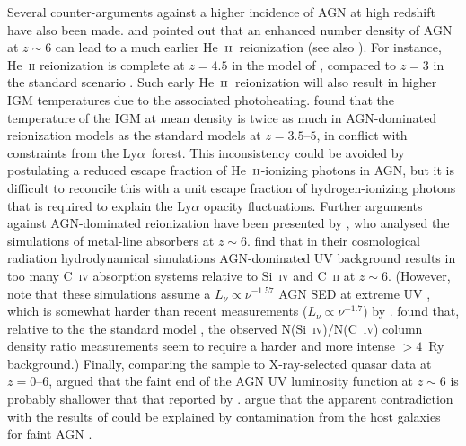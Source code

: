 \documentclass[fleqn,usenatbib]{mnras}
\def\lya{Ly$\alpha$~}
\def\HeII{\hbox{He~$\scriptstyle\rm II$}}
\begin{document}
Several counter-arguments against a higher incidence of AGN at high
redshift have also been made. \citet{2017MNRAS.468.4691D} and
\citet{2018MNRAS.473.1416M} pointed out that an enhanced number
density of AGN at $z\sim 6$ can lead to a much earlier
\HeII\ reionization (see also \citealt{2017MNRAS.471..255K}).  For
instance, He~\textsc{ii} reionization is complete at $z=4.5$ in the
model of \citet{2015ApJ...813L...8M}, compared to $z=3$ in the
standard scenario \citep{2012ApJ...746..125H}.  Such early
\HeII\ reionization will also result in higher IGM temperatures due to
the associated photoheating.  \citet{2017MNRAS.468.4691D} found that
the temperature of the IGM at mean density is twice as much in
AGN-dominated reionization models as the standard models at
$z=3.5$--$5$, in conflict with constraints from the \lya forest.  This
inconsistency could be avoided by postulating a reduced escape
fraction of \HeII-ionizing photons in AGN, but it is difficult to
reconcile this with a unit escape fraction of hydrogen-ionizing
photons that is required to explain the Ly$\alpha$ opacity
fluctuations.  Further arguments against AGN-dominated reionization
have been presented by \citet{2016MNRAS.459.2299F}, who analysed the
simulations of metal-line absorbers at $z\sim 6$.
\citet{2016MNRAS.459.2299F} find that in their cosmological radiation
hydrodynamical simulations AGN-dominated UV background results in too
many C~\textsc{iv} absorption systems relative to Si~\textsc{iv} and
C~\textsc{ii} at $z\sim 6$.  (However, note that these simulations
assume a $L_\nu\propto\nu^{-1.57}$ AGN SED at extreme UV
\citep{2002ApJ...565..773T}, which is somewhat harder than recent
measurements ($L_\nu\propto\nu^{-1.7}$) by
\citet{2015MNRAS.449.4204L}.  \citet{2016MNRAS.459.2299F} found that,
relative to the the standard model \citep{2012ApJ...746..125H}, the
observed N(Si~\textsc{iv})/N(C~\textsc{iv}) column density ratio
measurements seem to require a harder and more intense $>4$~Ry
background.)  Finally, comparing the \citet{2015AA...578A..83G} sample
to X-ray-selected quasar data at $z=0$--$6$,
\citet{2017MNRAS.465.1915R} argued that the faint end of the AGN UV
luminosity function at $z\sim 6$ is probably shallower that that
reported by \citet{2015AA...578A..83G}.  \citet{2017MNRAS.465.1915R}
argue that the apparent contradiction with the results of
\citet{2015AA...578A..83G} could be explained by contamination from
the host galaxies for faint AGN \citep[see
  also][]{2015MNRAS.453.1946G,2015MNRAS.448.3167W,2016MNRAS.463..348V}.
\end{document}
